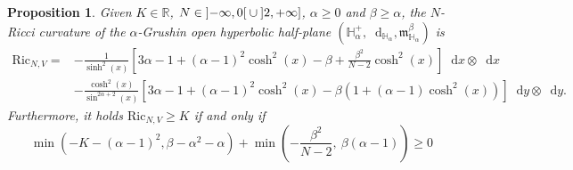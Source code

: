 \documentclass[11pt,twoside,a4paper]{article}
\makeatletter
\DeclarePairedDelimiter\abs{\lvert}{\rvert}%
\let\oldabs\abs
\def\abs{\@ifstar{\oldabs}{\oldabs*}}
\newcommand*\diff{\mathop{}\!\mathrm{d}}
\newcommand{\R}{\mathbb{R}}
\newcommand{\bbH}{\mathbb{H}}
\newcommand{\Ric}{\mathrm{Ric}}
\theoremstyle{theorem}
\newtheorem{prop}[theorem]{Proposition}
\theoremstyle{definition}
\theoremstyle{remark}
\theoremstyle{proof}
\makeatother
\begin{document}


\begin{prop}
    Given $K \in \R$, $N \in \ointerval{-\infty}{0} \cup \linterval{2}{+\infty}$, $\alpha \geq 0$ and $\beta \geq \alpha$, the $N$-Ricci curvature of the $\alpha$-Grushin open hyperbolic half-plane $(\bbH_\alpha^+, \diff_{\bbH_\alpha}, \mathfrak{m}^\beta_{\bbH_\alpha})$ is
\begin{align*}
    \Ric_{N,V}=&-\frac{1}{\sinh^2(x)}\left[3\alpha-1+(\alpha-1)^2\cosh^2(x) - \beta + \frac{\beta^2}{N-2}\cosh^2(x) \right]\diff x\otimes \diff x \\
    &-\frac{\cosh^2(x)}{\sin^{2\alpha+2}(x)}\left[3\alpha-1+(\alpha-1)^2\cosh^2(x) - \beta \left(1+(\alpha-1)\cosh^2(x)\right)\right]\diff y\otimes \diff y.
\end{align*}
    Furthermore, it holds $\Ric_{N,V} \geq K$ if and only if
    \[
    \min\left(-K-(\alpha-1)^2,\beta-\alpha^2-\alpha\right)+\min\left(-\frac{\beta^2}{N-2},~\beta(\alpha-1)\right)\geq 0
    \]
\end{prop}
\end{document}
